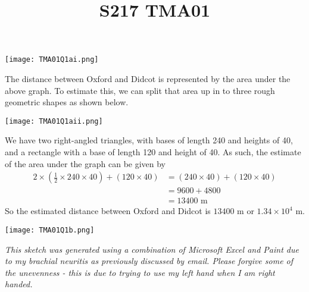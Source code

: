 \documentclass[a4paper,12pt]{article}
\title{S217 TMA01}
\date{}
\numberwithin{equation}{section}
\begin{document}
\maketitle

\begin{question}

\qpart

\qsubpart
\begin{center}
\texttt{[image: TMA01Q1ai.png]}
\end{center}

\qsubpart
The distance between Oxford and Didcot is represented by the area under the above graph. To estimate this, we can split that area up in to three rough geometric shapes as shown below.
\begin{center}
\texttt{[image: TMA01Q1aii.png]}
\end{center}
We have two right-angled triangles, with bases of length 240 and heights of 40, and a rectangle with a base of length 120 and height of 40. As such, the estimate of the area under the graph can be given by
\begin{align*}
2\times\left(\frac{1}{2}\times240\times40\right)+\left(120\times40\right)&=(240\times40)+(120\times40)\\
&=9600+4800\\
&=13400\text{ m}
\end{align*}
So the estimated distance between Oxford and Didcot is $13400$ m or $1.34\times10^4$ m.

\qpart
\begin{center}
\texttt{[image: TMA01Q1b.png]}
\end{center}
\textit{This sketch was generated using a combination of Microsoft Excel and Paint due to my brachial neuritis as previously discussed by email. Please forgive some of the unevenness - this is due to trying to use my left hand when I am right handed.}

\end{question}

\newpage
\end{document}
